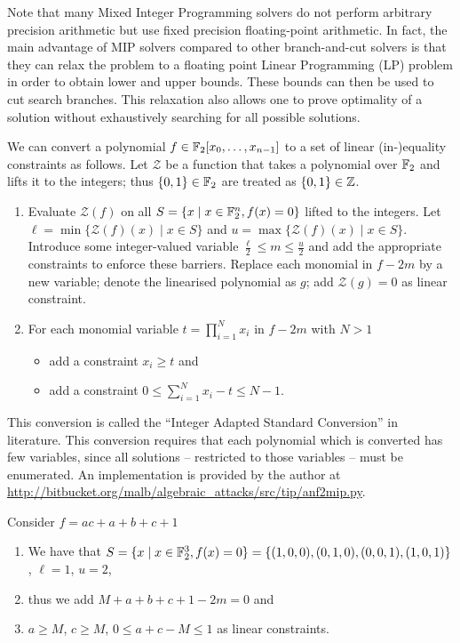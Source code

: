 Note that many Mixed Integer Programming solvers do not perform arbitrary precision arithmetic but use fixed precision floating-point arithmetic. In fact, the main advantage of MIP solvers compared to other branch-and-cut solvers is that they can relax the problem to a floating point Linear Programming (LP) problem in order to obtain lower and upper bounds. These bounds can then be used to cut search branches. This relaxation also allows one to prove optimality of a solution without exhaustively searching for all possible solutions.

We can convert a polynomial $f \in \mathbb{F}_2[x_0,\dots,x_{n-1}]$ to a set of linear (in-)equality constraints as follows. Let $\mathcal{Z}$ be a function that takes a polynomial over $\mathbb{F}_2$ and lifts it to the integers; thus $\{0,1\} \in \mathbb{F}_2$ are treated as $\{0,1\} \in \mathbb{Z}$.

\begin{enumerate}
 \item Evaluate $\mathcal{Z}(f)$ on all $S = \{x \mid x \in \mathbb{F}_2^n, f(x) = 0\}$ lifted to the integers. Let $\ell = \min\{\mathcal{Z}(f)(x) \mid x \in S\}$ and $u = \max\{\mathcal{Z}(f)(x) \mid x \in S\}$. Introduce some integer-valued variable $\frac{\ell}{2} \leq m \leq \frac{u}{2}$ and add the appropriate constraints to enforce these barriers. Replace each monomial in $f - 2m$ by a new variable; denote the linearised polynomial as $g$; add $\mathcal{Z}(g) = 0$  as linear constraint.
 \item For each monomial variable $t = \prod_{i=1}^{N} x_i$ in $f - 2m$ with $N > 1$
 \begin{itemize}
   \item add a constraint $x_i \geq t$ and
   \item add a constraint $0 \leq \sum_{i=1}^{N} x_i - t \leq N-1$.
 \end{itemize}
\end{enumerate}
 
This conversion is called the ``Integer Adapted Standard Conversion'' \cite{biviummip} in literature. This conversion requires that each polynomial which is converted has few variables, since all solutions -- restricted to those variables -- must be enumerated. An implementation is provided by the author at \url{http://bitbucket.org/malb/algebraic_attacks/src/tip/anf2mip.py}.

\begin{example}
Consider $f = ac + a + b + c + 1$
\begin{enumerate}
 \item We have that $S = \{x \mid x \in \mathbb{F}_2^3, f(x) =0\} = \{(1, 0, 0),(0, 1, 0),(0, 0, 1),(1, 0, 1)\}$, $\ell = 1$, $u = 2$,
 \item thus we add $M + a + b + c + 1 - 2m = 0$ and
 \item $a \geq M$, $c \geq M$, $0 \leq a + c - M \leq 1$ as linear constraints.
\end{enumerate}
\end{example}

